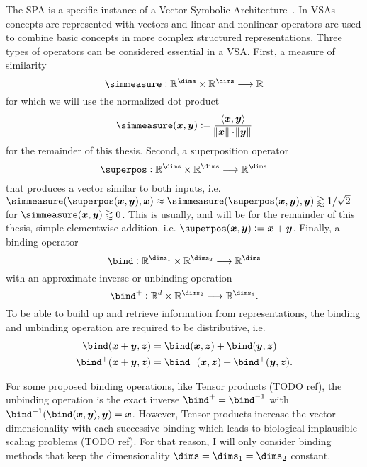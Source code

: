 The SPA is a specific instance of a Vector Symbolic Architecture~\parencite[VSA;][]{gayler_vector_2003}.
In VSAs concepts are represented with vectors and linear and nonlinear operators are used to combine basic concepts in more complex structured representations.
Three types of operators can be considered essential in a VSA\@.
First, a measure of similarity
\begin{equation}
    \simmeasure: \mathbb{R}^{\dims} \times \mathbb{R}^{\dims} \longrightarrow \mathbb{R}
\end{equation}
for which we will use the normalized dot product
\begin{equation}
    \simmeasure(\vc x, \vc y) := \frac{\left\langle \vc x, \vc y \right\rangle}{\norm{\vc x} \cdot \norm{\vc y}}
\end{equation}
for the remainder of this thesis.
Second, a superposition operator
\begin{equation}
    \superpos: \mathbb{R}^{\dims} \times \mathbb{R}^{\dims} \longrightarrow \mathbb{R}^{\dims}
\end{equation}
that produces a vector similar to both inputs, i.e.\ $\simmeasure(\superpos(\vc x, \vc y), \vc x) \approx \simmeasure(\superpos(\vc x, \vc y), \vc y) \gtrapprox 1/\sqrt{2}$ for $\simmeasure(\vc x, \vc y) \gtrapprox 0$.
This is usually, and will be for the remainder of this thesis, simple elementwise addition, i.e. $\superpos(\vc x, \vc y) := \vc x + \vc y$.
Finally, a binding operator
\begin{equation}
    \bind: \mathbb{R}^{\dims_1} \times \mathbb{R}^{\dims_2} \longrightarrow \mathbb{R}^{\dims}
\end{equation}
with an approximate inverse or unbinding operation
\begin{equation}
    \bind^+: \mathbb{R}^d \times \mathbb{R}^{\dims_2} \longrightarrow \mathbb{R}^{\dims_1} \text{.}
\end{equation}
To be able to build up and retrieve information from representations, the binding and unbinding operation are required to be distributive, i.e.
\begin{align}
    \bind(\vc x + \vc y, \vc z) &= \bind(\vc x, \vc z) + \bind(\vc y, \vc z) \\
    \bind^+(\vc x + \vc y, \vc z) &= \bind^+(\vc x, \vc z) + \bind^+(\vc y, \vc z) \text{.}
\end{align}

For some proposed binding operations, like Tensor products (TODO ref), the unbinding operation is the exact inverse $\bind^+ = \bind^{-1}$ with $\bind^{-1}(\bind(\vc x, \vc y), \vc y) = \vc x$.
However, Tensor products increase the vector dimensionality with each successive binding which leads to biological implausible scaling problems (TODO ref).
For that reason, I will only consider binding methods that keep the dimensionality $\dims = \dims_1 = \dims_2$ constant.

